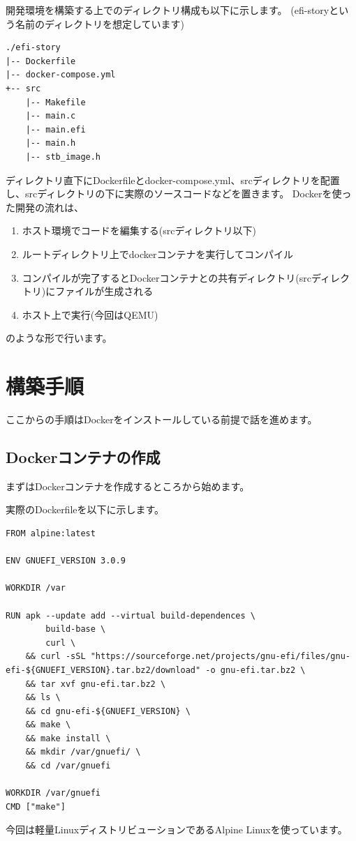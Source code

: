 \documentclass[10pt,b5paper,twoside,openany]{ltjsbook}
\begin{document}
開発環境を構築する上でのディレクトリ構成も以下に示します。
(efi-storyという名前のディレクトリを想定しています)
\begin{verbatim}
./efi-story
|-- Dockerfile
|-- docker-compose.yml
+-- src
    |-- Makefile
    |-- main.c
    |-- main.efi
    |-- main.h
    |-- stb_image.h
\end{verbatim}
ディレクトリ直下にDockerfileとdocker-compose.yml、srcディレクトリを配置し、srcディレクトリの下に実際のソースコードなどを置きます。
Dockerを使った開発の流れは、
\begin{enumerate}
    \item ホスト環境でコードを編集する(srcディレクトリ以下)
    \item ルートディレクトリ上でdockerコンテナを実行してコンパイル
    \item コンパイルが完了するとDockerコンテナとの共有ディレクトリ(srcディレクトリ)にファイルが生成される
    \item ホスト上で実行(今回はQEMU)
\end{enumerate} 
のような形で行います。

\section{構築手順}
ここからの手順はDockerをインストールしている前提で話を進めます。
\subsection{Dockerコンテナの作成}
まずはDockerコンテナを作成するところから始めます。

実際のDockerfileを以下に示します。
\begin{lstlisting}[style=customBash,caption=dockerfile,label=prog:dockerfile]
FROM alpine:latest

ENV GNUEFI_VERSION 3.0.9

WORKDIR /var

RUN apk --update add --virtual build-dependences \
        build-base \
        curl \
    && curl -sSL "https://sourceforge.net/projects/gnu-efi/files/gnu-efi-${GNUEFI_VERSION}.tar.bz2/download" -o gnu-efi.tar.bz2 \
    && tar xvf gnu-efi.tar.bz2 \
    && ls \
    && cd gnu-efi-${GNUEFI_VERSION} \
    && make \
    && make install \
    && mkdir /var/gnuefi/ \
    && cd /var/gnuefi

WORKDIR /var/gnuefi
CMD ["make"]
\end{lstlisting}
今回は軽量LinuxディストリビューションであるAlpine Linuxを使っています。
\end{document}
